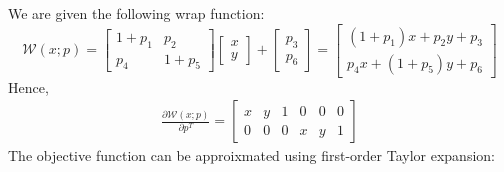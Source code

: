 \documentclass{article} %
\begin{document}
    We are given the following wrap function:
    \begin{equation*}
    \mathcal{W}\left(x;p\right)=\left[\begin{array}{cc}
    1+p_{1} & p_{2}\\
    p_{4} & 1+p_{5}
    \end{array}\right]\left[\begin{array}{c}
    x\\
    y
    \end{array}\right]+\left[\begin{array}{c}
    p_{3}\\
    p_{6}
    \end{array}\right]=\left[\begin{array}{c}
    \left(1+p_{1}\right)x+p_{2}y+p_{3}\\
    p_{4}x+\left(1+p_{5}\right)y+p_{6}
    \end{array}\right]
    \end{equation*}
    Hence,
    \begin{align*}
    \frac{\partial \mathcal{W}\left(x;p\right)}{\partial p^{T}}=\begin{bmatrix}
    x & y & 1 & 0 & 0 & 0\\
    0 & 0 & 0 & x & y & 1
    \end{bmatrix}
    \end{align*}
    The objective function can be approixmated using first-order Taylor expansion:
\end{document}
